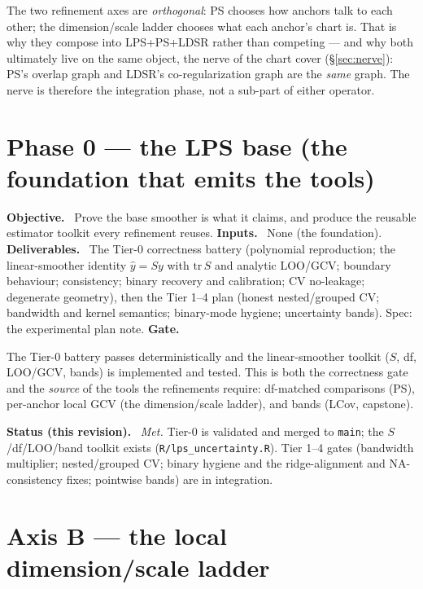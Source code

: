 \documentclass[11pt]{article}
\newcommand{\field}[1]{\smallskip\noindent\textbf{\textsf{#1.}}\ }
\begin{document}
\begin{note}
The two refinement axes are \emph{orthogonal}: PS chooses how anchors talk to each
other; the dimension/scale ladder chooses what each anchor's chart is. That is why
they compose into LPS+PS+LDSR rather than competing --- and why both ultimately live
on the same object, the nerve of the chart cover (\S\ref{sec:nerve}): PS's overlap
graph and LDSR's co-regularization graph are the \emph{same} graph. The nerve is
therefore the integration phase, not a sub-part of either operator.
\end{note}

\section{Phase 0 --- the LPS base (the foundation that emits the tools)}\label{sec:phase0}

\field{Objective} Prove the base smoother is what it claims, and produce the
reusable estimator toolkit every refinement reuses.
\field{Inputs} None (the foundation).
\field{Deliverables} The Tier-0 correctness battery (polynomial reproduction; the
linear-smoother identity $\hat y = Sy$ with $\mathrm{tr}\,S$ and analytic LOO/GCV;
boundary behaviour; consistency; binary recovery and calibration; CV no-leakage;
degenerate geometry), then the Tier 1--4 plan (honest nested/grouped CV; bandwidth
and kernel semantics; binary-mode hygiene; uncertainty bands). Spec: the experimental
plan note.
\field{Gate} \begin{gate} The Tier-0 battery passes deterministically and the
linear-smoother toolkit ($S$, df, LOO/GCV, bands) is implemented and tested. This is
both the correctness gate and the \emph{source} of the tools the refinements
require: df-matched comparisons (PS), per-anchor local GCV (the dimension/scale
ladder), and bands (LCov, capstone).\end{gate}
\field{Status (this revision)} \emph{Met.} Tier-0 is validated and merged to
\texttt{main}; the $S$/df/LOO/band toolkit exists (\texttt{R/lps\_uncertainty.R}).
Tier 1--4 gates (bandwidth multiplier; nested/grouped CV; binary hygiene and the
ridge-alignment and NA-consistency fixes; pointwise bands) are in integration.

\section{Axis B --- the local dimension/scale ladder}\label{sec:ladder}
\end{document}
